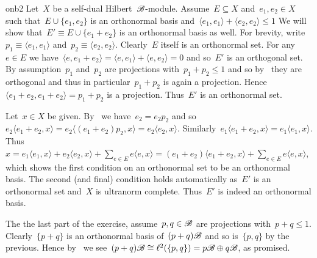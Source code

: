 \begin{solution}{onb2}%
Let~$X$ be a self-dual Hilbert~$\mathscr{B}$-module.
Assume~$E \subseteq X$ and~$e_1,e_2 \in X$
    such that~$E \cup \{ e_1, e_2\} $ is an orthonormal basis
    and~$\langle e_1, e_1 \rangle + \langle e_2, e_2\rangle \leq 1$
We will show that~$E' \equiv E \cup \{e_1 + e_2\}$
        is an orthonormal basis as well.
For brevity, write~$p_1 \equiv \langle e_1,e_1\rangle$
    and~$p_2 \equiv \langle e_2, e_2\rangle$.
Clearly~$E$ itself is an orthonormal set.
For any~$e \in E$ we have~$\langle e, e_1+e_2 \rangle =
    \langle e, e_1\rangle + \langle e,e_2\rangle = 0$
    and so~$E'$ is an orthogonal set.
By assumption~$p_1$ and~$p_2$ are projections
    with~$p_1 + p_2 \leq 1$
    and so by~
    they are orthogonal and thus in particular~$p_1 + p_2$
        is again a projection.
Hence~$\langle e_1 + e_2, e_1 + e_2 \rangle
        = p_1 + p_2$ is a projection.
    Thus~$E'$ is an orthonormal set.

Let~$x \in X$ be given.
By~ we have~$e_2 = e_2 p_2$
    and so~$e_2 \langle e_1 + e_2, x\rangle
                = e_2 \langle (e_1 + e_2)p_2, x\rangle
                = e_2 \langle e_2, x \rangle$.
Similarly~$e_1 \langle e_1 + e_2, x\rangle
                = e_1 \langle e_1, x\rangle$.
Thus~$ x = e_1 \langle e_1, x\rangle + e_2 \langle e_2, x\rangle 
            + \sum_{e \in E} e \langle e, x\rangle
        = (e_1 + e_2) \langle e_1 + e_2, x\rangle
            + \sum_{e \in E} e \langle e, x\rangle$,
            which shows the first condition on an orthonormal
            set to be an orthonormal basis.
The second (and final) condition
    holds automatically as~$E'$ is an orthonormal set
        and~$X$ is ultranorm complete.  Thus~$E'$ is indeed
        an orthonormal basis.

The the last part of the exercise, assume~$p,q \in \mathscr{B}$
    are projections with~$p+q \leq 1$.
    Clearly~$\{p+q\}$ is an orthonormal basis of~$(p+q)\mathscr{B}$
        and so is~$\{p,q\}$ by the previous.
    Hence by~
        we see~$(p+q) \mathscr{B} \cong \ell^2(\{p, q\})
            = p\mathscr{B} \oplus q\mathscr{B}$, as promised.
\end{solution}
